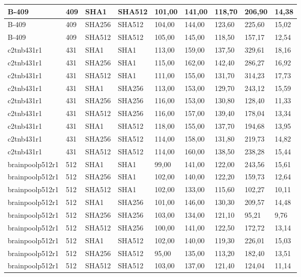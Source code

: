 \begin{longtable}{| l | l | l | l | l |l |l |l |l |}
B-409 & 409 & SHA1 & SHA512 & 101,00 & 141,00 & 118,70 & 206,90 & 14,38 \\ \hline 
B-409 & 409 & SHA256 & SHA512 & 104,00 & 144,00 & 123,60 & 225,60 & 15,02 \\ \hline 
B-409 & 409 & SHA512 & SHA512 & 105,00 & 145,00 & 118,50 & 157,17 & 12,54 \\ \hline 
c2tnb431r1 & 431 & SHA1 & SHA1 & 113,00 & 159,00 & 137,50 & 329,61 & 18,16 \\ \hline 
c2tnb431r1 & 431 & SHA256 & SHA1 & 115,00 & 162,00 & 142,40 & 286,27 & 16,92 \\ \hline 
c2tnb431r1 & 431 & SHA512 & SHA1 & 111,00 & 155,00 & 131,70 & 314,23 & 17,73 \\ \hline 
c2tnb431r1 & 431 & SHA1 & SHA256 & 113,00 & 153,00 & 129,70 & 243,12 & 15,59 \\ \hline 
c2tnb431r1 & 431 & SHA256 & SHA256 & 116,00 & 153,00 & 130,80 & 128,40 & 11,33 \\ \hline 
c2tnb431r1 & 431 & SHA512 & SHA256 & 116,00 & 157,00 & 139,40 & 178,04 & 13,34 \\ \hline 
c2tnb431r1 & 431 & SHA1 & SHA512 & 118,00 & 155,00 & 137,70 & 194,68 & 13,95 \\ \hline 
c2tnb431r1 & 431 & SHA256 & SHA512 & 114,00 & 158,00 & 131,80 & 219,73 & 14,82 \\ \hline 
c2tnb431r1 & 431 & SHA512 & SHA512 & 114,00 & 160,00 & 138,50 & 238,28 & 15,44 \\ \hline 
brainpoolp512r1 & 512 & SHA1 & SHA1 & 99,00 & 141,00 & 122,00 & 243,56 & 15,61 \\ \hline 
brainpoolp512r1 & 512 & SHA256 & SHA1 & 102,00 & 140,00 & 122,20 & 159,73 & 12,64 \\ \hline 
brainpoolp512r1 & 512 & SHA512 & SHA1 & 102,00 & 133,00 & 115,60 & 102,27 & 10,11 \\ \hline 
brainpoolp512r1 & 512 & SHA1 & SHA256 & 101,00 & 146,00 & 130,30 & 209,57 & 14,48 \\ \hline 
brainpoolp512r1 & 512 & SHA256 & SHA256 & 103,00 & 134,00 & 121,10 & 95,21 & 9,76 \\ \hline 
brainpoolp512r1 & 512 & SHA512 & SHA256 & 100,00 & 141,00 & 122,50 & 172,72 & 13,14 \\ \hline 
brainpoolp512r1 & 512 & SHA1 & SHA512 & 102,00 & 140,00 & 119,30 & 226,01 & 15,03 \\ \hline 
brainpoolp512r1 & 512 & SHA256 & SHA512 & 95,00 & 135,00 & 113,20 & 182,40 & 13,51 \\ \hline 
brainpoolp512r1 & 512 & SHA512 & SHA512 & 103,00 & 137,00 & 121,40 & 124,04 & 11,14 \\ \hline 

\end{longtable}
